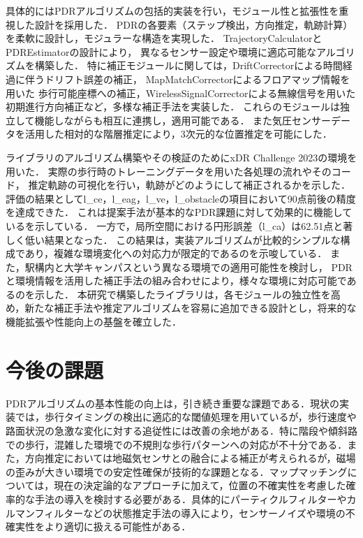 具体的にはPDRアルゴリズムの包括的実装を行い，モジュール性と拡張性を重視した設計を採用した．
PDRの各要素（ステップ検出，方向推定，軌跡計算）を柔軟に設計し，モジュラーな構造を実現した．
TrajectoryCalculatorとPDREstimatorの設計により，
異なるセンサー設定や環境に適応可能なアルゴリズムを構築した．
特に補正モジュールに関しては，DriftCorrectorによる時間経過に伴うドリフト誤差の補正，
MapMatchCorrectorによるフロアマップ情報を用いた
歩行可能座標への補正，WirelessSignalCorrectorによる無線信号を用いた初期進行方向補正など，多様な補正手法を実装した．
これらのモジュールは独立して機能しながらも相互に連携し，適用可能である．
また気圧センサーデータを活用した相対的な階層推定により，3次元的な位置推定を可能にした．

ライブラリのアルゴリズム構築やその検証のためにxDR Challenge 2023の環境を用いた．
実際の歩行時のトレーニングデータを用いた各処理の流れやそのコード，
推定軌跡の可視化を行い，軌跡がどのようにして補正されるかを示した．
評価の結果としてl\_ce，l\_eag，l\_ve，l\_obstacleの項目において90点前後の精度を達成できた．
これは提案手法が基本的なPDR課題に対して効果的に機能しているを示している．
一方で，局所空間における円形誤差（l\_ca）は62.51点と著しく低い結果となった．
この結果は，実装アルゴリズムが比較的シンプルな構成であり，複雑な環境変化への対応力が限定的であるのを示唆している．
また，駅構内と大学キャンパスという異なる環境での適用可能性を検討し，
PDRと環境情報を活用した補正手法の組み合わせにより，様々な環境に対応可能であるのを示した．
本研究で構築したライブラリは，各モジュールの独立性を高め，新たな補正手法や推定アルゴリズムを容易に追加できる設計とし，将来的な機能拡張や性能向上の基盤を確立した．


\section{今後の課題}

PDRアルゴリズムの基本性能の向上は，引き続き重要な課題である．現状の実装では，歩行タイミングの検出に適応的な閾値処理を用いているが，歩行速度や路面状況の急激な変化に対する追従性には改善の余地がある．特に階段や傾斜路での歩行，混雑した環境での不規則な歩行パターンへの対応が不十分である．また，方向推定においては地磁気センサとの融合による補正が考えられるが，磁場の歪みが大きい環境での安定性確保が技術的な課題となる．マップマッチングについては，現在の決定論的なアプローチに加えて，位置の不確実性を考慮した確率的な手法の導入を検討する必要がある．具体的にパーティクルフィルターやカルマンフィルターなどの状態推定手法の導入により，センサーノイズや環境の不確実性をより適切に扱える可能性がある．

